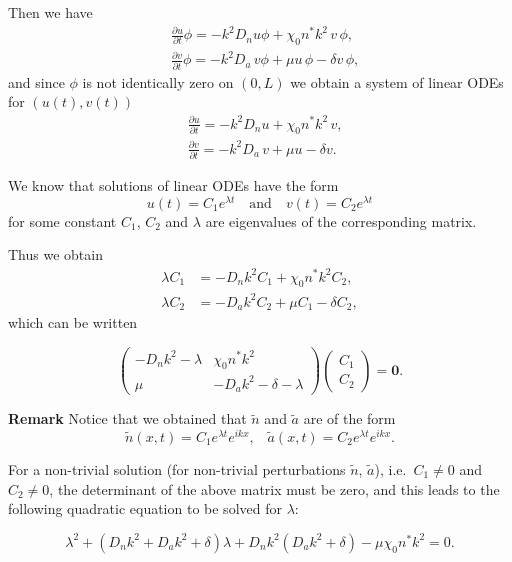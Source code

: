 \documentclass[
  letterpaper,
  DIV=11,
  numbers=noendperiod]{scrreprt}
\theoremstyle{plain}
\theoremstyle{definition}
\theoremstyle{plain}
\theoremstyle{remark}
\begin{document}
Then we have \[
\begin{aligned}
&\frac{\partial u}{\partial  t}  \phi  =   - k^2 D_n  u \phi +  \chi_0 n^* k^2\,  v \, \phi,  \\
& \frac{\partial v}{\partial  t} \phi =   - k^2 D_a  \, v \phi  +  \mu u \,  \phi - \delta v\,  \phi, 
\end{aligned}
\] and since \(\phi\) is not identically zero on \((0,L)\) we obtain a
system of linear ODEs for \((u(t),v(t))\) \[
\begin{aligned}
&\frac{\partial u}{\partial  t}    =   - k^2 D_n  u  +  \chi_0 n^* k^2\,  v,  \\
& \frac{\partial v}{\partial  t} =   - k^2 D_a  \, v  +  \mu u  - \delta v. 
\end{aligned}
\]

We know that solutions of linear ODEs have the form \[
u(t) = C_1 e^{\lambda t} \quad \textrm{and} \quad v(t) = C_2 e^{\lambda t}
\] for some constant \(C_1\), \(C_2\) and \(\lambda\) are eigenvalues of
the corresponding matrix.

Thus we obtain \[
\begin{aligned}
\lambda C_1 & =  - D_n k^2 C_1  + \chi_0 n^* k^2 C_2,  \\
\lambda C_2 & = - D_a k^2 C_2 +  \mu C_1 - \delta C_2,
\end{aligned}
\] which can be written

\[
\left(
\begin{array}{cc}
- D_n k^2 - \lambda &  \chi_0 n^* k^2 \\
\mu & - D_a k^2 -\delta -\lambda 
\end{array}
\right) 
\left(
\begin{array}{c}
C_1 \\
C_2
\end{array}
\right) = \mathbf{0} .
\]

\textbf{Remark} Notice that we obtained that \(\tilde n\) and
\(\tilde a\) are of the form
\[\tilde{n}(x,t) = C_1 e^{\lambda t} e^{ikx}, \;\;\; \tilde{a}(x,t) = C_2 e^{\lambda t} e^{ikx}.\]

For a non-trivial solution (for non-trivial perturbations \(\tilde n\),
\(\tilde a\)), i.e.~\(C_1 \neq 0\) and \(C_2 \neq 0\), the determinant
of the above matrix must be zero, and this leads to the following
quadratic equation to be solved for \(\lambda\):

\[
\lambda^2 + \left( D_n k^2 + D_a k^2 + \delta \right) \lambda + D_n k^2 \left( D_a k^2 + \delta \right) - \mu \chi_0 n^* k^2 = 0.
\]
\end{document}
